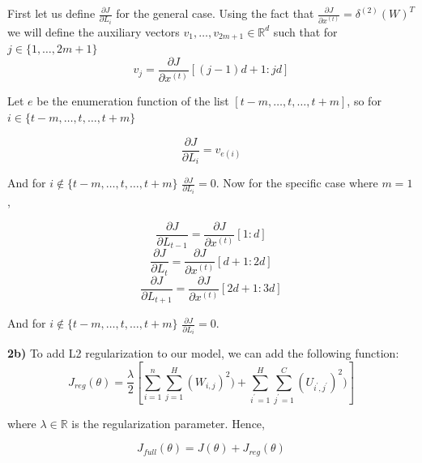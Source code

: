 \documentclass{article}
\begin{document}
First let us define $\frac{\partial J}{\partial  L_{i}}$ for the general case. Using the fact that $\frac{\partial J}{\partial  x^{(t)}}= \delta^{(2)} {(W)}^{T}$ we will define the auxiliary vectors  $v_{1}, \dots, v_{2m+1} \in \mathbb{R}^{d}$ such that for $j \in \{ 1, \dots, 2m+1\}$ 
\begin{equation}\label{eq:11}
v_{j} =  \frac{\partial J}{\partial  x^{(t)}}[(j-1)d +1: jd]
\end{equation}

Let $e$ be the enumeration function of the list $[t-m, \dots, t, \dots, t+m]$, so for $i \in \{ t-m, \dots, t, \dots, t+m \}$

\begin{equation}\label{eq:12}
\frac{\partial J}{\partial  L_{i}} =  v_{e(i)}
\end{equation}

And for $i \notin \{ t-m, \dots, t, \dots, t+m \}$ $\frac{\partial J}{\partial  L_{i}} =0$. Now for the specific case where $m=1$, 

\begin{equation}\label{eq:13}
\frac{\partial J}{\partial  L_{t-1}} =  \frac{\partial J}{\partial  x^{(t)}}[1: d]
\end{equation}
\begin{equation}\label{eq:14}
\frac{\partial J}{\partial  L_{t}} =  \frac{\partial J}{\partial  x^{(t)}}[d+1: 2d]
\end{equation}
\begin{equation}\label{eq:15}
\frac{\partial J}{\partial  L_{t+1}} =  \frac{\partial J}{\partial  x^{(t)}}[2d+1: 3d]
\end{equation}

And for $i \notin \{ t-m, \dots, t, \dots, t+m \}$ $\frac{\partial J}{\partial  L_{i}} =0$.

\textbf{2b)} To add L2 regularization to our model, we can add the following function:
\begin{equation}\label{eq:16}
J_{reg}(\theta) = \frac{\lambda}{2}[\sum_{i=1}^{n}\sum_{j=1}^{H}(W_{i,j})^{2}) + \sum_{i^{\prime}=1}^{H}\sum_{j^{\prime}=1}^{C}(U_{i^{\prime},j^{\prime}})^{2})]
\end{equation}

where $\lambda \in \mathbb{R}$ is the regularization parameter. Hence,

\begin{equation}\label{eq:17}
J_{full}(\theta) =J(\theta) + J_{reg}(\theta)
\end{equation}
\end{document}
